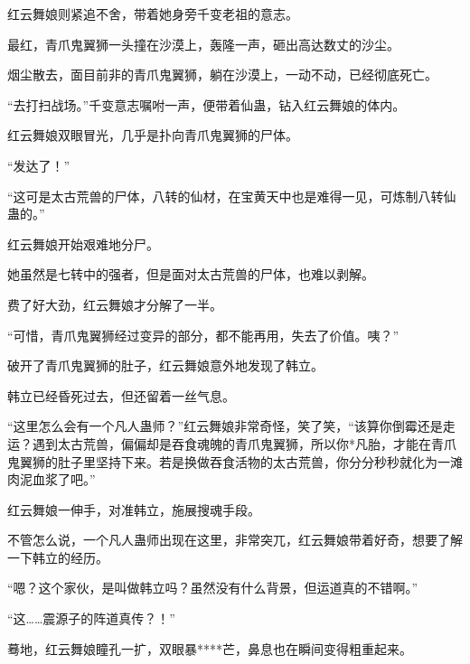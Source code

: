 \begin{this_body}
红云舞娘则紧追不舍，带着她身旁千变老祖的意志。

最红，青爪鬼翼狮一头撞在沙漠上，轰隆一声，砸出高达数丈的沙尘。

烟尘散去，面目前非的青爪鬼翼狮，躺在沙漠上，一动不动，已经彻底死亡。

“去打扫战场。”千变意志嘱咐一声，便带着仙蛊，钻入红云舞娘的体内。

红云舞娘双眼冒光，几乎是扑向青爪鬼翼狮的尸体。

“发达了！”

“这可是太古荒兽的尸体，八转的仙材，在宝黄天中也是难得一见，可炼制八转仙蛊的。”

红云舞娘开始艰难地分尸。

她虽然是七转中的强者，但是面对太古荒兽的尸体，也难以剥解。

费了好大劲，红云舞娘才分解了一半。

“可惜，青爪鬼翼狮经过变异的部分，都不能再用，失去了价值。咦？”

破开了青爪鬼翼狮的肚子，红云舞娘意外地发现了韩立。

韩立已经昏死过去，但还留着一丝气息。

“这里怎么会有一个凡人蛊师？”红云舞娘非常奇怪，笑了笑，“该算你倒霉还是走运？遇到太古荒兽，偏偏却是吞食魂魄的青爪鬼翼狮，所以你*凡胎，才能在青爪鬼翼狮的肚子里坚持下来。若是换做吞食活物的太古荒兽，你分分秒秒就化为一滩肉泥血浆了吧。”

红云舞娘一伸手，对准韩立，施展搜魂手段。

不管怎么说，一个凡人蛊师出现在这里，非常突兀，红云舞娘带着好奇，想要了解一下韩立的经历。

“嗯？这个家伙，是叫做韩立吗？虽然没有什么背景，但运道真的不错啊。”

“这……震源子的阵道真传？！”

蓦地，红云舞娘瞳孔一扩，双眼暴****芒，鼻息也在瞬间变得粗重起来。

\end{this_body}

